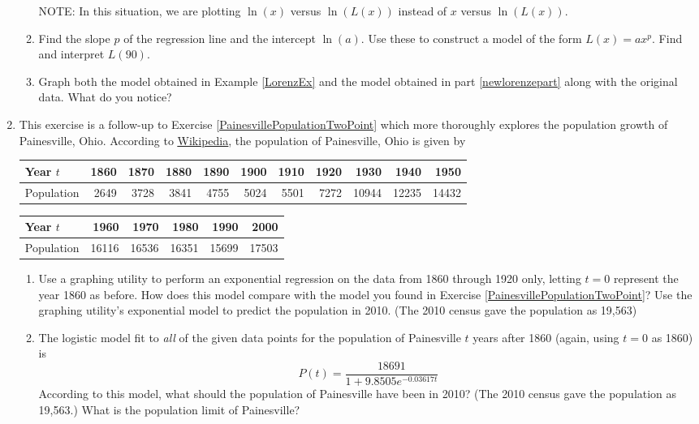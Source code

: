 \documentclass{ximera}
\begin{document}
\begin{enumerate}
\begin{enumerate}
NOTE:  In this situation, we are plotting $\ln(x)$ versus $\ln(L(x))$ instead of $x$ versus $\ln(L(x))$.  

\item  \label{newlorenzepart} Find the slope $p$ of the regression line and the intercept $\ln(a)$.  Use these to construct a model of the form $L(x) = a x^{p}$.   Find and interpret $L(90)$.

\item   Graph both the model obtained in Example \ref{LorenzEx} and the model obtained in part \ref{newlorenzepart} along with the original data.  What do you notice?

\end{enumerate}

\item  \label{PainesvillePopulationManyPoints} This exercise is a follow-up to Exercise \ref{PainesvillePopulationTwoPoint} which more thoroughly explores the population growth of Painesville, Ohio.  According to \href{http://en.wikipedia.org/wiki/Painesville}{\underline{Wikipedia}}, the population of Painesville, Ohio is given by


\noindent \begin{tabular}{|l|r|r|r|r|r|r|r|r|r|r|} \hline
Year $t$ & 1860 & 1870 & 1880 & 1890 & 1900 & 1910 & 1920 & 1930 & 1940 & 1950 \\ \hline 
Population& 2649 & 3728 & 3841 & 4755 & 5024 & 5501 & 7272 & 10944 & 12235 & 14432 \\ \hline
\end{tabular}

\noindent \begin{tabular}{|l|r|r|r|r|r|} \hline
Year $t$ & 1960 & 1970 & 1980 & 1990 & 2000 \\ \hline 
Population& 16116 & 16536 & 16351 & 15699 & 17503 \\ \hline
\end{tabular}

\begin{enumerate}

\item  Use a graphing utility to perform an exponential regression on the data from 1860 through 1920 only, letting $t = 0$ represent the year 1860 as before.  How does this model compare with the model you found in Exercise \ref{PainesvillePopulationTwoPoint}?   Use the graphing utility's exponential model to predict the population in 2010.   (The 2010 census gave the population as 19,563)

\item  The logistic model fit to \emph{all} of the given data points for the population of Painesville $t$ years after 1860 (again, using $t = 0$ as 1860) is \[ P(t) = \dfrac{18691}{1+9.8505e^{-0.03617t}} \] According to this model, what should the population of Painesville have been in 2010?  (The 2010 census gave the population as 19,563.) What is the population limit of Painesville?


\end{enumerate}
\end{enumerate}
\end{document}
